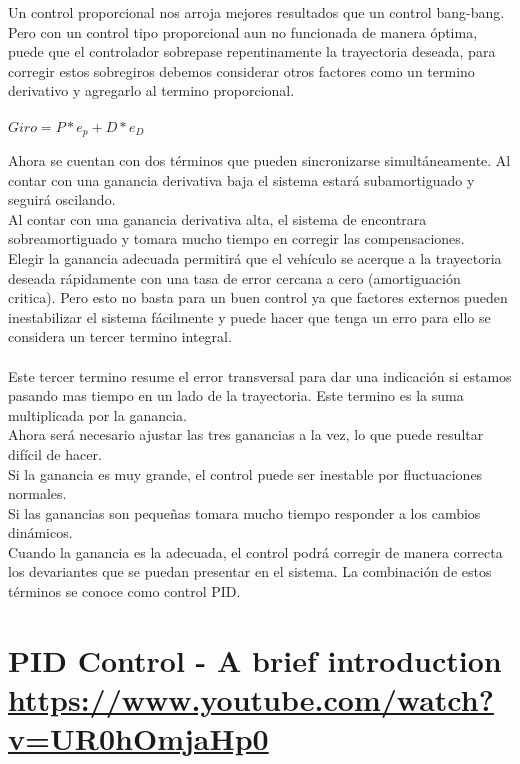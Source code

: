 \documentclass[
	12pt, %
]{fphw}
\begin{document}
Un control proporcional nos arroja mejores resultados que un control bang-bang. Pero con un control tipo proporcional aun no funcionada de manera óptima, puede que el controlador sobrepase repentinamente la trayectoria deseada, para corregir estos sobregiros debemos considerar otros factores como un termino derivativo y agregarlo al termino proporcional.\\\\

$Giro = P*e_{p}+D* e_{D}$

Ahora se cuentan con dos términos que pueden sincronizarse simultáneamente. 
Al contar con una ganancia derivativa baja el sistema estará subamortiguado y seguirá oscilando.\\
Al contar con una ganancia derivativa alta, el sistema de encontrara sobreamortiguado y tomara mucho tiempo en corregir las compensaciones.\\
Elegir la ganancia adecuada permitirá que el vehículo se acerque a la trayectoria deseada rápidamente con una tasa de error cercana a cero (amortiguación critica). Pero esto no basta para un buen control ya que factores externos pueden inestabilizar el sistema fácilmente y puede hacer que tenga un erro para ello se considera un tercer termino integral.\\\\
Este tercer termino resume el error transversal para dar una indicación si estamos pasando mas tiempo en un lado de la trayectoria. Este termino es la suma multiplicada por la ganancia.\\
Ahora será necesario ajustar las tres ganancias a la vez, lo que puede resultar difícil de hacer.\\
Si la ganancia es muy grande, el control puede ser inestable por fluctuaciones normales.\\
Si las ganancias son pequeñas tomara mucho tiempo responder a los cambios dinámicos.\\
Cuando la ganancia es la adecuada, el control podrá corregir de manera correcta los devariantes que se puedan presentar en el sistema.
La combinación de estos términos se conoce como control PID.



\newpage
\section*{{\color{RoyalPurple}PID Control - A brief introduction} \url{https://www.youtube.com/watch?v=UR0hOmjaHp0}}
\end{document}
